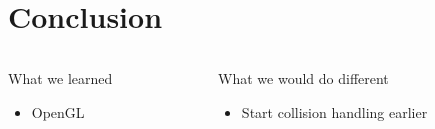 \section{Conclusion}
\begin{frame}
	\begin{columns}[t]
		\begin{column}{0.5\textwidth}
			\begin{block}{What we learned}
				\begin{itemize}
					\item OpenGL
				\end{itemize}
			\end{block}
		\end{column}
		\begin{column}{0.5\textwidth}
			\begin{block}{What we would do different}
				\begin{itemize}
					\item Start collision handling earlier
				\end{itemize}
			\end{block}
		\end{column}
	\end{columns}
\end{frame}
